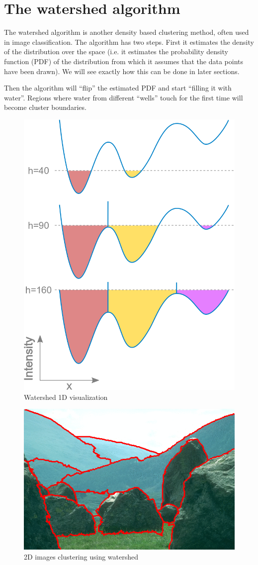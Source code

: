 \section{The watershed algorithm}
  The watershed algorithm is another density based clustering method, often used in image classification.
  The algorithm has two steps. First it estimates the density of the distribution over the space (i.e. 
  it estimates the probability density function (PDF) of the distribution from which it assumes that the data points
  have been drawn). We will see exactly how this can be done in later sections. 
  
  Then the algorithm will ``flip'' the estimated PDF and start ``filling it with water''. Regions where water from different
  ``wells'' touch for the first time will become cluster boundaries.
  
  \begin{figure}[h]
  \centering
  \includegraphics[width=.7\linewidth]{chapter_2/files/Watershed-flooding-graph.png}
  \caption{Watershed 1D visualization }
  \end{figure}
  
  \begin{figure}[h]
  \centering
  \includegraphics[width=.7\linewidth]{chapter_2/files/PW_overlay.png}
  \caption{2D images clustering using watershed}
  \end{figure}
